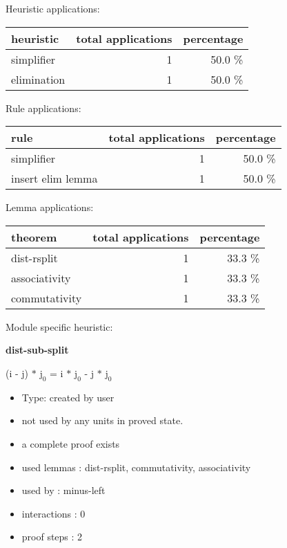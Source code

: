 \documentclass[a4paper]{article}
\begin{document}
\medskip


Heuristic applications:

\begin{supertabular}{l|r|r}
heuristic	& total applications & percentage \\ \hline
simplifier & 1 & 50.0 \% \\
elimination & 1 & 50.0 \% \\

\end{supertabular}

Rule applications:

\begin{supertabular}{l|r|r}
rule	        & total applications & percentage \\ \hline
simplifier & 1 & 50.0 \% \\
insert elim lemma & 1 & 50.0 \% \\

\end{supertabular}

Lemma applications:

\begin{supertabular}{l|r|r}
theorem	        & total applications & percentage \\ \hline
dist-rsplit & 1 & 33.3 \% \\
associativity & 1 & 33.3 \% \\
commutativity & 1 & 33.3 \% \\

\end{supertabular}

Module specific heuristic:

\pagebreak

{\LARGE\bf dist-sub-split}\label{lemma-dist-sub-split}

\medskip

 \Fol (i - j) $*$ $\mbox{j}_{0}$ = i $*$ $\mbox{j}_{0}$ - j $*$ $\mbox{j}_{0}$

\begin{itemize}

\item Type: created by user

\item not used by any units in proved state.
\item       a complete proof exists
\item       used lemmas  : dist-rsplit, commutativity, associativity
\item       used by      : minus-left
\item       interactions : 0
\item       proof steps  : 2
\end{itemize}
\end{document}
